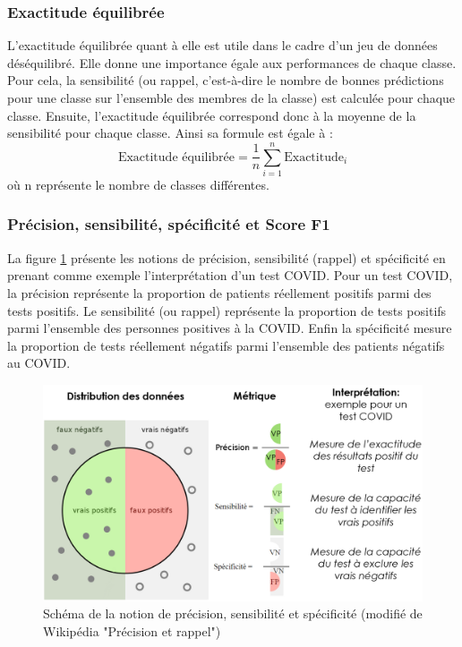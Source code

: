 \subsubsection{Exactitude équilibrée}
L'exactitude équilibrée quant à elle est utile dans le cadre d'un jeu de données déséquilibré. Elle donne une importance égale aux performances de chaque classe. Pour cela, la sensibilité (ou rappel, c'est-à-dire le nombre de bonnes prédictions pour une classe sur l'ensemble des membres de la classe) est calculée pour chaque classe. Ensuite, l'exactitude équilibrée correspond donc à la moyenne de la sensibilité pour chaque classe. Ainsi sa formule est égale à :
\[ \text{Exactitude équilibrée} = \frac{1}{n} \sum_{i=1}^{n} \text{Exactitude}_i \] où n représente le nombre de classes différentes.

\subsubsection{Précision, sensibilité, spécificité et Score F1}
La figure \ref{fig:prec_recall_spec} présente les notions de précision, sensibilité (rappel) et spécificité en prenant comme exemple l'interprétation d'un test COVID. Pour un test COVID, la précision représente la proportion de patients réellement positifs parmi des tests positifs. Le sensibilité (ou rappel) représente la proportion de tests positifs parmi l'ensemble des personnes positives à la COVID. Enfin la spécificité mesure la proportion de tests réellement négatifs parmi l'ensemble des patients négatifs au COVID.

\begin{figure}[!ht]
 \centering
 \includegraphics[width=1\textwidth]{figures/prec_recall.png}
 \caption[Précision, sensibilité et spécificité]{Schéma de la notion de précision, sensibilité et spécificité (modifié de Wikipédia "Précision et rappel")}
 \label{fig:prec_recall_spec}
\end{figure}

